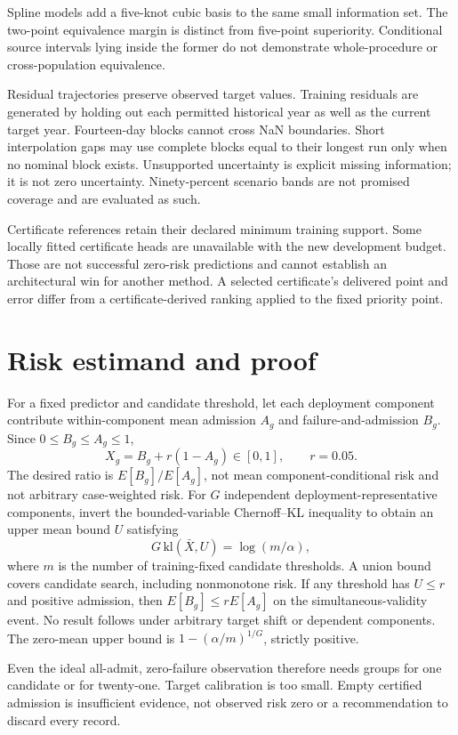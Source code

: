 \documentclass[draft]{agujournal2025}
\begin{document}
Spline models add a five-knot cubic basis to the same small information set. The two-point equivalence margin is distinct from five-point superiority. Conditional source intervals lying inside the former do not demonstrate whole-procedure or cross-population equivalence.

Residual trajectories preserve observed target values. Training residuals are generated by holding out each permitted historical year as well as the current target year. Fourteen-day blocks cannot cross NaN boundaries. Short interpolation gaps may use complete blocks equal to their longest run only when no nominal block exists. Unsupported uncertainty is explicit missing information; it is not zero uncertainty. Ninety-percent scenario bands are not promised coverage and are evaluated as such.

Certificate references retain their declared minimum training support. Some locally fitted certificate heads are unavailable with the new development budget. Those are not successful zero-risk predictions and cannot establish an architectural win for another method. A selected certificate's delivered point and error differ from a certificate-derived ranking applied to the fixed priority point.

\section{Risk estimand and proof}
For a fixed predictor and candidate threshold, let each deployment component contribute within-component mean admission $A_g$ and failure-and-admission $B_g$. Since $0\leq B_g\leq A_g\leq1$,
\[
 X_g=B_g+r(1-A_g)\in[0,1],\qquad r=0.05.
\]
The desired ratio is $E[B_g]/E[A_g]$, not mean component-conditional risk and not arbitrary case-weighted risk. For $G$ independent deployment-representative components, invert the bounded-variable Chernoff--KL inequality to obtain an upper mean bound $U$ satisfying
\[
 G\,\mathrm{kl}(\bar X,U)=\log(m/\alpha),
\]
where $m$ is the number of training-fixed candidate thresholds. A union bound covers candidate search, including nonmonotone risk. If any threshold has $U\leq r$ and positive admission, then $E[B_g]\leq r E[A_g]$ on the simultaneous-validity event. No result follows under arbitrary target shift or dependent components. The zero-mean upper bound is $1-(\alpha/m)^{1/G}$, strictly positive.

Even the ideal all-admit, zero-failure observation therefore needs \RSingleThresholdGroups{} groups for one candidate or \RGridThresholdGroups{} for twenty-one. Target calibration is too small. Empty certified admission is insufficient evidence, not observed risk zero or a recommendation to discard every record.
\end{document}
